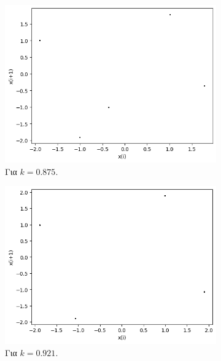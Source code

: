 \begin{figure}[h!]
\begin{subfigure}[b]{0.4\textwidth}
		\includegraphics[width=\textwidth]{LateX images/graphs q19/g11}
		\caption{Για $k=0.875$.}
		\label{f:k100}
	\end{subfigure}
	\hfill
	\begin{subfigure}[b]{0.4\textwidth}
		\centering
		\includegraphics[width=\textwidth]{LateX images/graphs q19/g12}
		\caption{Για $k=0.921$.}
		\label{f:k101}
	\end{subfigure}
	\hfill
	\begin{subfigure}[b]{0.4\textwidth}
		\centering

\end{subfigure}
\end{figure}
